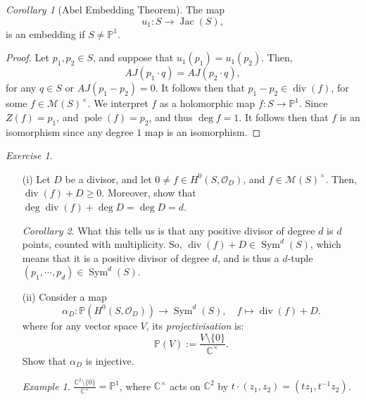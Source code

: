 \documentclass[a4paper]{report}
\theoremstyle{definition}
\theoremstyle{remark}
\theoremstyle{proposition}
\theoremstyle{conjecture}
\theoremstyle{lemma}
\theoremstyle{corollary}
\newtheorem{corollary}{Corollary}
\theoremstyle{exercise}
\newtheorem{exercise}{Exercise}
\theoremstyle{example}
\newtheorem{example}{Example}
\newcommand{\C}{\mathbb{C}}
\newcommand{\mcal}{\mathcal}
\newcommand{\on}{\operatorname}
\begin{document}
\begin{corollary}[Abel Embedding Theorem]
    The map 
    $$u_1 : S \longrightarrow \on{Jac}(S),$$
    is an embedding if $S \neq \mathbb{P}^1$.
\end{corollary}

\begin{proof}
    Let $p_1,p_2\in S$, and suppose that $u_1(p_1) = u_1(p_2)$. Then,
    $$AJ(p_1\cdot q) = AJ(p_2\cdot q),$$
    for any $q\in S$
    or $AJ(p_1-p_2) = 0$. 
    It follows then that $p_1-p_2 \in \on{div}(f)$, for some 
    $f\in\mcal{M}(S)^\times$.
    We interpret $f$ as a holomorphic map $f : S \to \mathbb{P}^1$. 
    Since $Z(f) = p_1$, and $\on{pole}(f) = p_2$, and thus 
    $\deg f = 1$. It follows then that $f$ is an isomorphism 
    since any degree $1$ map is an isomorphism.
\end{proof}

\begin{exercise}
    \leavevmode
    \begin{itemize}
        \item[(i)] Let $D$ be a divisor, and let 
            $0\neq f \in H^0(S,\mcal{O}_D)$, and $f\in\mcal{M}(S)^\times$.
            Then, $\on{div}(f) + D \geq 0$. 
            Moreover, show that 
            $\deg \on{div}(f) + \deg D = \deg D = d$.
            \begin{corollary}
                What this tells us is that any positive divisor of degree $d$
                is $d$ points, counted with multiplicity. So, 
                $\on{div}(f) + D \in \on{Sym}^d(S)$, which means that 
                it is a positive divisor of degree $d$, and is thus 
                a $d$-tuple $(p_1,\cdots,p_d) \in \on{Sym}^d(S)$.
            \end{corollary}
        \item[(ii)] Consider a map 
            $$\alpha_D : \mathbb{P}(H^0(S,\mcal{O}_D)) \longrightarrow \on{Sym}^d(S),\quad f\longmapsto \on{div}(f) + D.$$
            where for any vector space $V$, its \emph{projectivisation} is:
            $$\mathbb{P}(V) := \frac{V\setminus \lbrace 0\rbrace}{\C^\times}.$$
            Show that $\alpha_D$ is injective.
            \begin{example}
                $\frac{\C^2\setminus \lbrace 0\rbrace}{\C^\times} = \mathbb{P}^1$,
                where $\C^\times$ acts on $\C^2$ by $t\cdot(z_1,z_2) = (tz_1,t^{-1}z_2)$.
            \end{example}
    \end{itemize}
\end{exercise}
\end{document}
